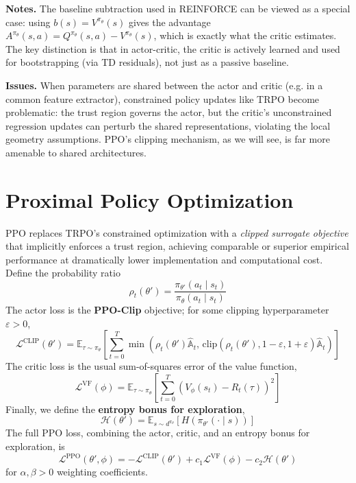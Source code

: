 \documentclass[11pt, letterpaper]{article}
\begin{document}
\begin{remark}
    \textbf{Notes.} The baseline subtraction used in REINFORCE can be viewed as a special case: using \(b(s) = V^{\pi_\theta}(s)\) gives the advantage \(A^{\pi_\theta}(s,a) = Q^{\pi_\theta}(s,a) - V^{\pi_\theta}(s)\), which is exactly what the critic estimates. The key distinction is that in actor-critic, the critic is actively learned and used for bootstrapping (via TD residuals), not just as a passive baseline. 
    
    \textbf{Issues.} When parameters are shared between the actor and critic (e.g. in a common feature extractor), constrained policy updates like TRPO become problematic: the trust region governs the actor, but the critic's unconstrained regression updates can perturb the shared representations, violating the local geometry assumptions. PPO's clipping mechanism, as we will see, is far more amenable to shared architectures. 
\end{remark}

\section{Proximal Policy Optimization}

\begin{concept}
    PPO replaces TRPO's constrained optimization with a \textit{clipped surrogate objective} that implicitly enforces a trust region, achieving comparable or superior empirical performance at dramatically lower implementation and computational cost. Define the probability ratio 
    \[
        \rho_t(\theta') = \frac{\pi_{\theta'}(a_t \mid s_t)}{\pi_\theta(a_t \mid s_t)}
    \]
    The actor loss is the \textbf{PPO-Clip} objective; for some clipping hyperparameter \(\varepsilon>0\), 
    \[
        \mathcal{L}^{\text{CLIP}}(\theta') = \mathbb{E}_{\tau \sim \pi_\theta} \left[ \sum_{t=0}^T \min\left( \rho_t(\theta') \widehat{\mathbb{A}}_t,\, \text{clip}(\rho_t(\theta'), 1-\varepsilon, 1+\varepsilon) \widehat{\mathbb{A}}_t \right) \right]
    \]
    The critic loss is the usual sum-of-squares error of the value function, 
    \[
        \mathcal{L}^{\text{VF}}(\phi) = \mathbb{E}_{\tau \sim \pi_\theta}\left[\sum_{t=0}^T (V_\phi(s_t) - R_t(\tau))^2\right]
    \]
    Finally, we define the \textbf{entropy bonus for exploration}, 
    \[
        \mathcal{H}(\theta') = \mathbb{E}_{s \sim d^{\pi_\theta}}[H(\pi_{\theta'}(\cdot \mid s))]
    \]
    The full PPO loss, combining the actor, critic, and an entropy bonus for exploration, is 
    \[
        \boxed{
            \mathcal{L}^{\text{PPO}}(\theta', \phi) 
            = -\mathcal{L}^{\text{CLIP}}(\theta') + c_1 \mathcal{L}^{\text{VF}}(\phi) - c_2 \mathcal{H}(\theta')
        }
    \]
    for \(\alpha, \beta > 0\) weighting coefficients. 
\end{concept}
\end{document}

